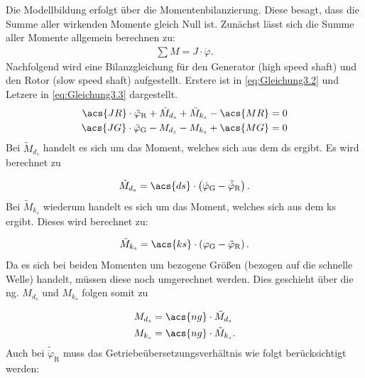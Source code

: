 Die Modellbildung erfolgt über die Momentenbilanzierung. Diese besagt, dass die Summe aller wirkenden Momente gleich Null ist. Zunächst lässt sich die Summe aller Momente allgemein berechnen zu:
\begin{align}
    \sum M = J \cdot \ddot\varphi.
    \label{eq:Gleichung3.1}
\end{align}
\newline
Nachfolgend wird eine Bilanzgleichung für den Generator (high speed shaft) und den Rotor (slow speed shaft) aufgestellt. Erstere ist in \autoref{eq:Gleichung3.2} und Letzere in \autoref{eq:Gleichung3.3} dargestellt.
\begin{align}
    \label{eq:Gleichung3.2}
   \acs{JR} \cdot \ddot{\varphi}_{\mathrm{R}} + \tilde{M}_{d_s} + \tilde{M}_{k_s} - \acs{MR} &= 0 \\
   \label{eq:Gleichung3.3}
   \acs{JG} \cdot \ddot{\varphi}_{\mathrm{G}} - {M}_{d_s} - {M}_{k_s} + \acs{MG} &= 0
\end{align}
\newline
Bei $\tilde{M}_{d_s}$ handelt es sich um das Moment, welches sich aus dem \ac{ds} ergibt. Es wird berechnet zu

\begin{align}
   \tilde{M}_{d_s} = \acs{ds} \cdot \left( \dot\varphi_{\mathrm{G}} - \tilde{\dot\varphi}_{\mathrm{R}}\right).
   \label{eq:Gleichung3.4}
\end{align}
\newpage
Bei $\tilde{M}_{k_s}$ wiederum handelt es sich um das Moment, welches sich aus dem \ac{ks} ergibt. Dieses wird berechnet zu:

\begin{align}
   \tilde{M}_{k_s} = \acs{ks} \cdot \left( \varphi_{\mathrm{G}} - \tilde{\varphi}_{\mathrm{R}}\right).
   \label{eq:Gleichung3.5}
\end{align}
\newline
Da es sich bei beiden Momenten um bezogene Größen (bezogen auf die schnelle Welle) handelt, müssen diese noch umgerechnet werden. Dies geschieht über die \ac{ng}. $M_{d_s}$ und $M_{k_s}$ folgen somit zu

\begin{align}
    \label{eq:Gleichung3.6}
   M_{d_s} &= \acs{ng} \cdot \tilde{M}_{d_s} \\
   \label{eq:Gleichung3.7}
   M_{k_s} &= \acs{ng} \cdot \tilde{M}_{k_s}.
\end{align}
\newline
Auch bei $\tilde{\dot\varphi}_{\mathrm{R}}$ muss das Getriebeübersetzungsverhältnis wie folgt berücksichtigt werden:

